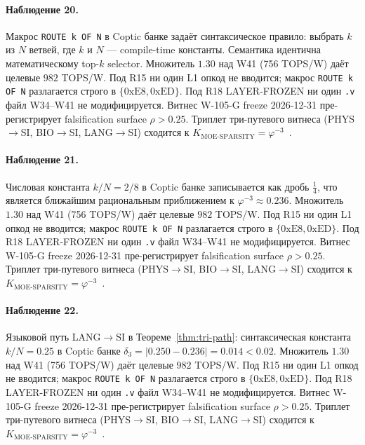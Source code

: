 \paragraph{Наблюдение 20.} Макрос \texttt{ROUTE k OF N} в Coptic банке задаёт синтаксическое правило: выбрать $k$ из $N$ ветвей, где $k$ и $N$ --- compile-time константы. Семантика идентична математическому top-$k$ selector. Множитель $1{.}30$ над W41 (756 TOPS/W) даёт целевые $982$ TOPS/W. Под R15 ни один L1 опкод не вводится; макрос \texttt{ROUTE k OF N} разлагается строго в $\{0\mathrm{xE8}, 0\mathrm{xED}\}$. Под R18 LAYER-FROZEN ни один \texttt{.v} файл W34--W41 не модифицируется. Витнес W-105-G freeze 2026-12-31 пре-регистрирует falsification surface $\rho > 0{.}25$. Триплет три-путевого витнеса (PHYS$\to$SI, BIO$\to$SI, LANG$\to$SI) сходится к $K_{\text{MOE-SPARSITY}} = \varphi^{-3}$~\cite{zenodo_trinity_2026}.

\paragraph{Наблюдение 21.} Числовая константа $k/N = 2/8$ в Coptic банке записывается как дробь $\frac{1}{4}$, что является ближайшим рациональным приближением к $\varphi^{-3} \approx 0{.}236$. Множитель $1{.}30$ над W41 (756 TOPS/W) даёт целевые $982$ TOPS/W. Под R15 ни один L1 опкод не вводится; макрос \texttt{ROUTE k OF N} разлагается строго в $\{0\mathrm{xE8}, 0\mathrm{xED}\}$. Под R18 LAYER-FROZEN ни один \texttt{.v} файл W34--W41 не модифицируется. Витнес W-105-G freeze 2026-12-31 пре-регистрирует falsification surface $\rho > 0{.}25$. Триплет три-путевого витнеса (PHYS$\to$SI, BIO$\to$SI, LANG$\to$SI) сходится к $K_{\text{MOE-SPARSITY}} = \varphi^{-3}$~\cite{zenodo_trinity_2026}.

\paragraph{Наблюдение 22.} Языковой путь LANG$\to$SI в Теореме~\ref{thm:tri-path}: синтаксическая константа $k/N = 0{.}25$ в Coptic банке $\delta_3 = |0{.}250 - 0{.}236| = 0{.}014 < 0{.}02$. Множитель $1{.}30$ над W41 (756 TOPS/W) даёт целевые $982$ TOPS/W. Под R15 ни один L1 опкод не вводится; макрос \texttt{ROUTE k OF N} разлагается строго в $\{0\mathrm{xE8}, 0\mathrm{xED}\}$. Под R18 LAYER-FROZEN ни один \texttt{.v} файл W34--W41 не модифицируется. Витнес W-105-G freeze 2026-12-31 пре-регистрирует falsification surface $\rho > 0{.}25$. Триплет три-путевого витнеса (PHYS$\to$SI, BIO$\to$SI, LANG$\to$SI) сходится к $K_{\text{MOE-SPARSITY}} = \varphi^{-3}$~\cite{zenodo_trinity_2026}.

